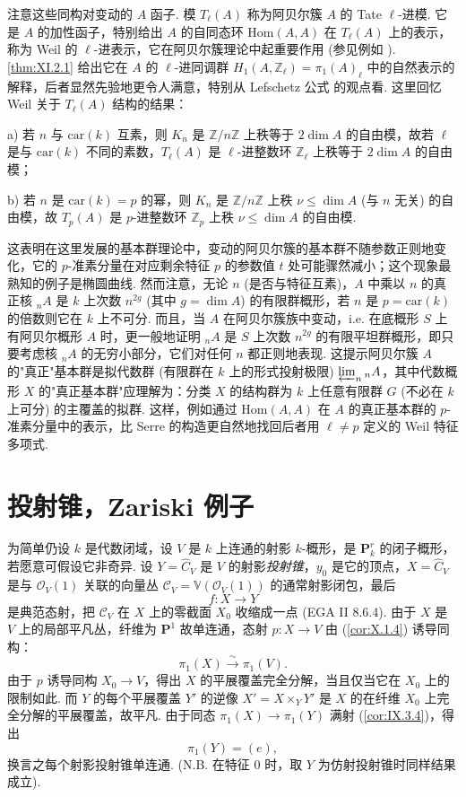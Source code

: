注意这些同构对变动的 $A$ 函子. 模 $T_\ell(A)$ 称为阿贝尔簇 $A$ 的 Tate $\ell$-进模. 它是 $A$ 的加性函子，特别给出 $A$ 的自同态环 $\mathrm{Hom}(A, A)$ 在 $T_\ell(A)$ 上的表示，称为 Weil 的 $\ell$-进表示，它在阿贝尔簇理论中起重要作用 (参见例如 \cite[第七章]{exp11-4}). \cref{thm:XI.2.1} 给出它在 $A$ 的 $\ell$-进同调群 $H_1(A, \mathbb{Z}_\ell) = \pi_1(A)_\ell$ 中的自然表示的解释，后者显然先验地更令人满意，特别从 Lefschetz 公式 \cite[第五章]{exp11-4} 的观点看. 这里回忆 Weil 关于 $T_\ell(A)$ 结构的结果：

a) 若 $n$ 与 $\mathrm{car}(k)$ 互素，则 $K_n$ 是 $\mathbb{Z}/n\mathbb{Z}$ 上秩等于 $2 \dim A$ 的自由模，故若 $\ell$ 是与 $\mathrm{car}(k)$ 不同的素数，$T_\ell(A)$ 是 $\ell$-进整数环 $\mathbb{Z}_\ell$ 上秩等于 $2 \dim A$ 的自由模；

b) 若 $n$ 是 $\mathrm{car}(k) = p$ 的幂，则 $K_n$ 是 $\mathbb{Z}/n\mathbb{Z}$ 上秩 $\nu \leqslant \dim A$ (与 $n$ 无关) 的自由模，故 $T_p(A)$ 是 $p$-进整数环 $\mathbb{Z}_p$ 上秩 $\nu \leqslant \dim A$ 的自由模.

这表明在这里发展的基本群理论中，变动的阿贝尔簇的基本群不随参数正则地变化，它的 $p$-准素分量在对应剩余特征 $p$ 的参数值 $t$ 处可能骤然减小；这个现象最熟知的例子是椭圆曲线. 然而注意，无论 $n$ (是否与特征互素)，$A$ 中乘以 $n$ 的真正核 ${}_n A$ 是 $k$ 上次数 $n^{2g}$ (其中 $g = \dim A$) 的有限群概形，若 $n$ 是 $p = \mathrm{car}(k)$ 的倍数则它在 $k$ 上不可分. 而且，当 $A$ 在阿贝尔簇族中变动，i.e. 在底概形 $S$ 上有阿贝尔概形 $A$ 时，更一般地证明 ${}_n A$ 是 $S$ 上次数 $n^{2g}$ 的有限平坦群概形，即只要考虑核 ${}_n A$ 的无穷小部分，它们对任何 $n$ 都正则地表现. 这提示阿贝尔簇 $A$ 的"真正"基本群是拟代数群 (有限群在 $k$ 上的形式投射极限) $\varprojlim_n {}_n A$，其中代数概形 $X$ 的"真正基本群"应理解为：分类 $X$ 的结构群为 $k$ 上任意有限群 $G$ (不必在 $k$ 上可分) 的主覆盖的拟群. 这样，例如通过 $\mathrm{Hom}(A, A)$ 在 $A$ 的真正基本群的 $p$-准素分量中的表示，比 Serre \cite{exp11-8} 的构造更自然地找回后者用 $\ell \neq p$ 定义的 Weil 特征多项式.

\section{投射锥，Zariski 例子}

为简单仍设 $k$ 是代数闭域，设 $V$ 是 $k$ 上连通的射影 $k$-概形，是 $\mathbf{P}^r_k$ 的闭子概形，若愿意可假设它非奇异. 设 $Y = \widehat{C}_V$ 是 $V$ 的射影\emph{投射锥}，$y_0$ 是它的顶点，$X = \widehat{C}_V$ 是与 $\mathcal{O}_V(1)$ 关联的向量丛 $\mathcal{C}_V = \mathbb{V}(\mathcal{O}_V(1))$ 的通常射影闭包，最后
\[
f \colon X \longrightarrow Y
\]
是典范态射，把 $\mathcal{C}_V$ 在 $X$ 上的零截面 $X_0$ 收缩成一点 (EGA II 8.6.4). 由于 $X$ 是 $V$ 上的局部平凡丛，纤维为 $\mathbf{P}^1$ 故单连通，态射 $p \colon X \to V$ 由 (\cref{cor:X.1.4}) 诱导同构：
\[
\pi_1(X) \xrightarrow{\sim} \pi_1(V).
\]
由于 $p$ 诱导同构 $X_0 \to V$，得出 $X$ 的平展覆盖完全分解，当且仅当它在 $X_0$ 上的限制如此. 而 $Y$ 的每个平展覆盖 $Y'$ 的逆像 $X' = X \times_Y Y'$ 是 $X$ 的在纤维 $X_0$ 上完全分解的平展覆盖，故平凡. 由于同态 $\pi_1(X) \to \pi_1(Y)$ 满射 (\cref{cor:IX.3.4})，得出
\[
\pi_1(Y) = (e),
\]
换言之每个射影投射锥单连通. (N.B. 在特征 0 时，取 $Y$ 为仿射投射锥时同样结果成立).

